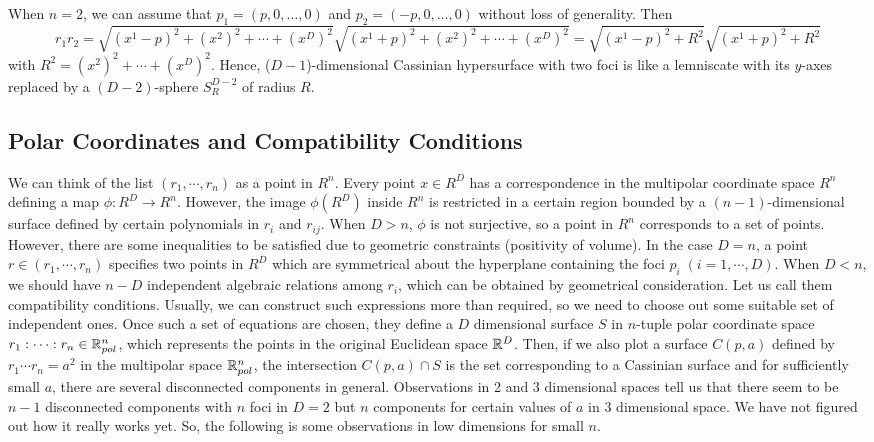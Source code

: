 \documentclass{article}
\begin{document}
When $n=2$, we can assume that $p_1 = (p,0,\dots,0)$ and $p_2 = (-p,0,\dots,0)$ without loss of generality. Then
\begin{equation}
\label{ }
r_1r_2 = \sqrt{(x^1-p)^2 + (x^2)^2 + \cdots + (x^D)^2}\sqrt{(x^1+p)^2 + (x^2)^2 + \cdots + (x^D)^2} = \sqrt{(x^1-p)^2 + R^2}\sqrt{(x^1+p)^2 + R^2}
\end{equation}
with $R^2 = (x^2)^2 + \cdots + (x^D)^2$. Hence, ($D-1$)-dimensional Cassinian hypersurface with two foci is like a lemniscate with its $y$-axes replaced by a $(D-2)$-sphere $S_R^{D-2}$ of radius $R$.

\subsection{Polar Coordinates and Compatibility Conditions}
\label{sec-1-3}
We can think of the list $(r_1,\cdots,r_n)$ as a point in $R^n$.
 Every point $x \in R^D$ has a correspondence in the multipolar coordinate space $R^n$ defining a map $\phi:R^D \rightarrow R^n$.
 However, the image $\phi(R^D)$ inside $R^n$ is restricted in a certain region bounded by a $(n-1)$-dimensional surface defined by certain polynomials in $r_i$ and $r_{ij}$.
 When $D > n$, $\phi$ is not surjective, so a point in $R^n$ corresponds to a set of points. However, there are some inequalities to be satisfied due to geometric constraints (positivity of volume). In the case $D=n$, a point $r \in (r_1, \cdots,r_n)$ specifies two points in $R^D$ which are symmetrical about the hyperplane containing the foci $p_i \;(i=1,\cdots,D)$. When $D<n$, we should have $n-D$ independent algebraic relations among $r_i$, which can be obtained by geometrical consideration. Let us call them compatibility conditions. Usually, we can construct such expressions more than required, so we need to choose out some suitable set of independent ones. Once such a set of equations are chosen, they define a $D$ dimensional surface $S$ in $n$-tuple polar coordinate space $r_1:\cdots:r_n \in \mathbb R_{pol}^n$, which represents the points in the original Euclidean space $\mathbb R^D$. Then, if we also plot a surface $C(p,a)$ defined by $r_1\cdots r_n = a^2$ in the multipolar space $\mathbb R_{pol}^n$, the intersection $C(p,a) \cap S$ is the set corresponding to a Cassinian surface and for sufficiently small $a$, there are several disconnected components in general. Observations in 2 and 3 dimensional spaces tell us that there seem to be $n-1$ disconnected components with $n$ foci in $D=2$ but $n$ components for certain values of $a$ in 3 dimensional space. We have not figured out how it really works yet. So, the following is some observations in low dimensions for small $n$.
\end{document}

